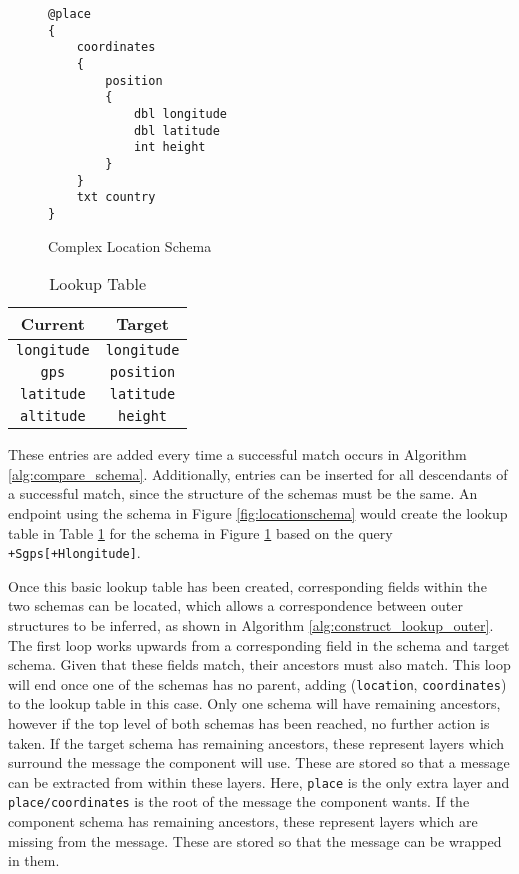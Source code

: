 \documentclass[12pt,twoside,notitlepage]{report}
\begin{document}
\begin{figure}
\begin{lstlisting}
@place
{
	coordinates
	{
		position
		{
			dbl longitude
			dbl latitude
			int height
		}
	}
	txt country
}
\end{lstlisting}
\caption{Complex Location Schema}
\label{fig:complexlocationschema}
\end{figure}

\begin{table}[b]
\centering

\begin{tabular}{c c}
\hline\hline
Current & Target \\
\hline
{\tt longitude} & {\tt longitude} \\
{\tt gps} & {\tt position} \\
{\tt latitude} & {\tt latitude} \\
{\tt altitude} & {\tt height} \\

\hline
\end{tabular}

\caption{Lookup Table}
\label{tab:lookup_table}
\end{table}
 
These entries are added every time a successful match occurs in Algorithm \ref{alg:compare_schema}. 
Additionally, entries can be inserted for all descendants of a successful match, since the structure of the schemas must be the same. 
An endpoint using the schema in Figure \ref{fig:locationschema} would create the lookup table in Table \ref{tab:lookup_table} for the schema in Figure \ref{fig:complexlocationschema} based on the query {\tt +Sgps[+Hlongitude]}.

Once this basic lookup table has been created, corresponding fields within the two schemas can be located, which allows a correspondence between outer structures to be inferred, as shown in Algorithm \ref{alg:construct_lookup_outer}. 
The first loop works upwards from a corresponding field in the schema and target schema. 
Given that these fields match, their ancestors must also match. 
This loop will end once one of the schemas has no parent, adding ({\tt location}, {\tt coordinates}) to the lookup table in this case. 
Only one schema will have remaining ancestors, however if the top level of both schemas has been reached, no further action is taken. 
If the target schema has remaining ancestors, these represent layers which surround the message the component will use. 
These are stored so that a message can be extracted from within these layers. 
Here, {\tt place} is the only extra layer and {\tt place/coordinates} is the root of the message the component wants. 
If the component schema has remaining ancestors, these represent layers which are missing from the message. 
These are stored so that the message can be wrapped in them. 
\end{document}
